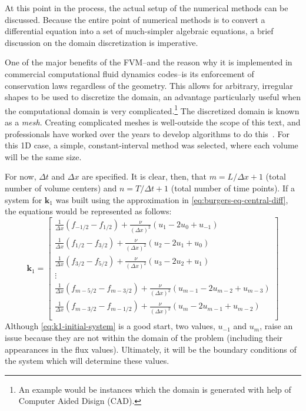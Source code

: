 At this point in the process, the actual setup of the numerical methods can be discussed.
Because the entire point of numerical methods is to convert a differential equation into a set of much-simpler algebraic equations, a brief discussion on the domain discretization is imperative.

One of the major benefits of the FVM--and the reason why it is implemented in commercial computational fluid dynamics codes--is its enforcement of conservation laws regardless of the geometry.
This allows for arbitrary, irregular shapes to be used to discretize the domain, an advantage particularly useful when the computational domain is very complicated.\footnote{An example would be instances which the domain is generated with help of Computer Aided Disign (CAD).}
The discretized domain is known as a \textit{mesh}.
Creating complicated meshes is well-outside the scope of this text, and professionals have worked over the years to develop algorithms to do this~\autocite{mazumderNumericalMethodsPartial2016}.
For this 1D case, a simple, constant-interval method was selected, where each volume will be the same size.

For now, $\Delta t$ and $\Delta x$ are specified.
It is clear, then, that $m=L/\Delta x+1$ (total number of volume centers) and $n=T/\Delta t+1$ (total number of time points).
If a system for $\mathbf{k}_1$ was built using the approximation in \cref{eq:burgers-eq-central-diff}, the equations would be represented as follows:
\begin{equation}
    \label{eq:k1-initial-system}
    \mathbf{k}_1 =
    \begin{bmatrix}
        \frac{1}{\Delta x}\left( f_{-1/2}-f_{1/2} \right)+\frac{\nu }{\left( \Delta x \right)^2}\left( u_1-2u_0+u_{-1} \right)\\
        \frac{1}{\Delta x}\left( f_{1/2}-f_{3/2} \right)+\frac{\nu }{\left( \Delta x \right)^2}\left( u_2-2u_1+u_0 \right)\\
        \frac{1}{\Delta x}\left( f_{3/2}-f_{5/2} \right)+\frac{\nu }{\left( \Delta x \right)^2}\left( u_3-2u_2+u_1 \right)\\
        \vdots                                                                                                                             \\
        \frac{1}{\Delta x}\left( f_{m-5/2}-f_{m-3/2} \right)+\frac{\nu }{\left( \Delta x \right)^2}\left( u_{m-1}-2u_{m-2}+u_{m-3} \right)\\
        \frac{1}{\Delta x}\left( f_{m-3/2}-f_{m-1/2} \right)+\frac{\nu }{\left( \Delta x \right)^2}\left( u_{m}-2u_{m-1}+u_{m-2} \right)\\
    \end{bmatrix}
\end{equation}
Although \cref{eq:k1-initial-system} is a good start, two values, $u_{-1}$ and $u_{m}$, raise an issue because they are not within the domain of the problem (including their appearances in the flux values).
Ultimately, it will be the boundary conditions of the system which will determine these values.

